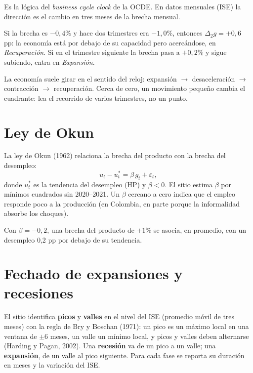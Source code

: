 Es la lógica del \emph{business cycle clock} de la OCDE. En datos mensuales (ISE) la dirección es el cambio en tres
meses de la brecha mensual.

\begin{dato}
Si la brecha es $-0{,}4\%$ y hace dos trimestres era $-1{,}0\%$, entonces $\Delta_2 g=+0{,}6$ pp: la economía está
por debajo de su capacidad pero acercándose, en \emph{Recuperación}. Si en el trimestre siguiente la brecha pasa a
$+0{,}2\%$ y sigue subiendo, entra en \emph{Expansión}.
\end{dato}

\begin{leer}
La economía suele girar en el sentido del reloj: expansión $\rightarrow$ desaceleración $\rightarrow$ contracción
$\rightarrow$ recuperación. Cerca de cero, un movimiento pequeño cambia el cuadrante: lea el recorrido de varios
trimestres, no un punto.
\end{leer}

\section{Ley de Okun}
\label{es:f:okun}
La ley de Okun (1962) relaciona la brecha del producto con la brecha del desempleo:
\[
u_t-u^*_t=\beta\,g_t+\varepsilon_t,
\]
donde $u^*_t$ es la tendencia del desempleo (HP) y $\beta<0$. El sitio estima $\beta$ por mínimos cuadrados sin
2020--2021. Un $\beta$ cercano a cero indica que el empleo responde poco a la producción (en Colombia, en parte
porque la informalidad absorbe los choques).

\begin{dato}
Con $\beta=-0{,}2$, una brecha del producto de $+1\%$ se asocia, en promedio, con un desempleo 0,2 pp por debajo de
su tendencia.
\end{dato}

\section{Fechado de expansiones y recesiones}
\label{es:f:bryboschan}
El sitio identifica \textbf{picos} y \textbf{valles} en el nivel del ISE (promedio móvil de tres meses) con la regla de
Bry y Boschan (1971): un pico es un máximo local en una ventana de $\pm6$ meses, un valle un mínimo local, y picos y
valles deben alternarse (Harding y Pagan, 2002). Una \textbf{recesión} va de un pico a un valle; una
\textbf{expansión}, de un valle al pico siguiente. Para cada fase se reporta su duración en meses y la variación
del ISE.

